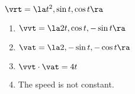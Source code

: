 {$\vrt = \la t^2, \sin t, \cos t \ra$
}
{\begin{enumerate}
\item $\vvt = \la 2t, \cos t, -\sin t \ra$
\item $\vat = \la 2, -\sin t, -\cos t \ra$
\item $\vvt \cdot \vat = 4t$
\item The speed is not constant.
\end{enumerate}
}

